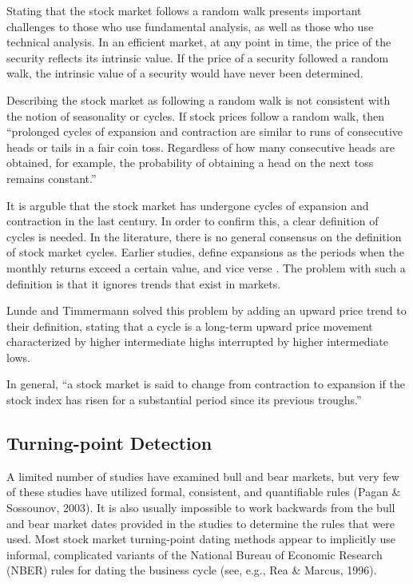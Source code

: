 \documentclass[]{book}
\begin{document}
Stating that the stock market follows a random walk presents important challenges to those who use fundamental analysis, as well as those who use technical analysis. In an efficient market, at any point in time, the price of the security reflects its intrinsic value. If the price of a security followed a random walk, the intrinsic value of a security would have never been determined. \citep{fama1995random}

Describing the stock market as following a random walk is not consistent with the notion of seasonality or cycles. If stock prices follow a random walk, then ``prolonged cycles of expansion and contraction are similar to runs of consecutive heads or tails in a fair coin toss. Regardless of how many consecutive heads are obtained, for example, the probability of obtaining a head on the next toss remains constant.'' \citep{cochran1995duration}

It is arguble that the stock market has undergone cycles of expansion and contraction in the last century. In order to confirm this, a clear definition of cycles is needed. In the literature, there is no general consensus on the definition of stock market cycles. Earlier studies, define expansions as the periods when the monthly returns exceed a certain value, and vice verse \citep{fabozzi1977stability, kim1979analysis, chen1982examination}. The problem with such a definition is that it ignores trends that exist in markets.

Lunde and Timmermann \citeyearpar{lunde2004duration} solved this problem by adding an upward price trend to their definition, stating that a cycle is a long-term upward price movement characterized by higher intermediate highs interrupted by higher intermediate lows.

In general, ``a stock market is said to change from contraction to expansion if the stock index has risen for a substantial period since its previous troughs.'' \citep{chong2010investigation}

\citep{ohn2004testing}

\citep{harman2007nonlinear}

\hypertarget{turning-point-detection}{%
\subsection{Turning-point Detection}\label{turning-point-detection}}

\citep{gonzalez2005two}

A limited number of studies have examined bull and bear markets, but very few of these studies have utilized formal, consistent, and quantifiable rules (Pagan \& Sossounov, 2003). It is also usually impossible to work backwards from the bull and bear market dates provided in the studies to determine the rules that were used. Most stock market turning-point dating methods appear to implicitly use informal, complicated variants of the National Bureau of Economic Research (NBER) rules for dating the business cycle (see, e.g., Rea \& Marcus, 1996).
\end{document}
